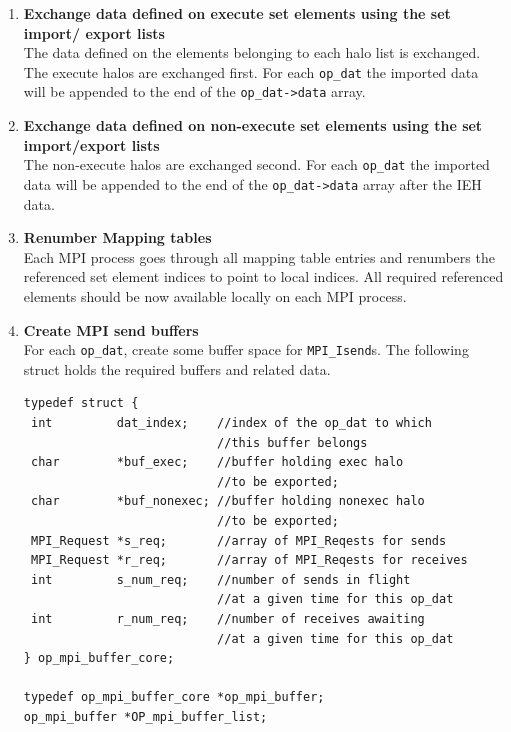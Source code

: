 \documentclass[11pt]{article}
\begin{document}
\begin{enumerate}
\item \textbf{Exchange data defined on execute set elements using the set import/ export lists}\\
The data defined on the elements belonging to each halo list is exchanged. The execute halos are exchanged first.
For each \texttt{op\_dat} the imported data will be appended to the end of the \texttt{op\_dat->data} array.

\item \textbf{Exchange data defined on non-execute set elements using the set import/export lists}\\
The non-execute halos are exchanged second. For each \texttt{op\_dat} the imported data will be appended to the end of
the \texttt{op\_dat->data} array after the IEH data.

\item \textbf{Renumber Mapping tables}\\
Each MPI process goes through all mapping table entries and renumbers the referenced set element indices to point
to local indices. All required referenced elements should be now available locally on each MPI process.

\item \textbf{Create MPI send buffers}\\
For each \texttt{op\_dat}, create some buffer space for \texttt{MPI\_Isend}s. The following struct holds the required
buffers and related data.
\begin{verbatim}
typedef struct {
 int         dat_index;    //index of the op_dat to which
                           //this buffer belongs
 char        *buf_exec;    //buffer holding exec halo
                           //to be exported;
 char        *buf_nonexec; //buffer holding nonexec halo
                           //to be exported;
 MPI_Request *s_req;       //array of MPI_Reqests for sends
 MPI_Request *r_req;       //array of MPI_Reqests for receives
 int         s_num_req;    //number of sends in flight
                           //at a given time for this op_dat
 int         r_num_req;    //number of receives awaiting
                           //at a given time for this op_dat
} op_mpi_buffer_core;

typedef op_mpi_buffer_core *op_mpi_buffer;
op_mpi_buffer *OP_mpi_buffer_list;
\end{verbatim}



\end{enumerate}
\end{document}
